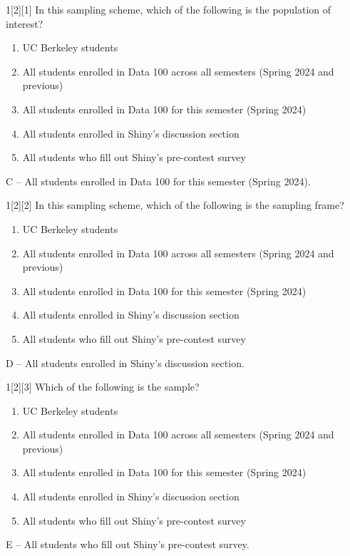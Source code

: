 \documentclass{article}
\begin{document}
\newpage

\begin{dshw}{1}[2][1]
	In this sampling scheme, which of the following is the population of
	interest?
	\begin{enumerate}[label=\Alph*.]
		\item UC Berkeley students
		\item All students enrolled in Data 100 across all semesters (Spring 2024
		and previous)
		\item All students enrolled in Data 100 for this semester (Spring 2024)
		\item All students enrolled in Shiny’s discussion section
		\item All students who fill out Shiny’s pre-contest survey
	\end{enumerate}
\end{dshw}
\begin{solution}
	C -- All students enrolled in Data 100 for this semester (Spring 2024).
\end{solution}

\begin{dshw}{1}[2][2]
	In this sampling scheme, which of the following is the sampling
	frame?
	\begin{enumerate}[label=\Alph*.]
		\item UC Berkeley students
		\item All students enrolled in Data 100 across all semesters (Spring 2024
		and previous)
		\item All students enrolled in Data 100 for this semester (Spring 2024)
		\item All students enrolled in Shiny’s discussion section
		\item All students who fill out Shiny’s pre-contest survey
	\end{enumerate}
\end{dshw}
\begin{solution}
	D -- All students enrolled in Shiny's discussion section.
\end{solution}

\begin{dshw}{1}[2][3]
	Which of the following is the sample?
	\begin{enumerate}[label=\Alph*.]
		\item UC Berkeley students
		\item All students enrolled in Data 100 across all semesters (Spring 2024
		and previous)
		\item All students enrolled in Data 100 for this semester (Spring 2024)
		\item All students enrolled in Shiny’s discussion section
		\item All students who fill out Shiny’s pre-contest survey
	\end{enumerate}
\end{dshw}
\begin{solution}
	E -- All students who fill out Shiny’s pre-contest survey.
\end{solution}
\end{document}
